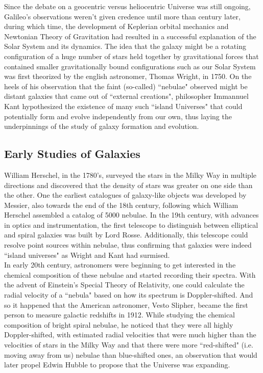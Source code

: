 Since the debate on a geocentric versus heliocentric Universe was still ongoing, Galileo's observations weren't given credence until more than century later, during which time, the development of Keplerian orbital mechanics and Newtonian Theory of Gravitation had resulted in a successful explanation of the Solar System and its dynamics. The idea that the galaxy might be a rotating configuration of a huge number of stars held together by gravitational forces that contained smaller gravitationally bound configurations such as our Solar System was first theorized by the english astronomer, Thomas Wright, in 1750. On the heels of his observation that the faint (so-called) ``nebulae" observed might be distant galaxies that came out of ``external creations", philosopher Immannuel Kant hypothesized the existence of many such ``island Universes" that could potentially form and evolve independently from our own, thus laying the underpinnings of the study of galaxy formation and evolution.\\

\subsection{Early Studies of Galaxies}

William Herschel, in the 1780's, surveyed the stars in the Milky Way in multiple directions and discovered that the density of stars was greater on one side than the other. One the earliest catalogues of galaxy-like objects was developed by Messier, also towards the end of the 18th century, following which William Herschel assembled a catalog of 5000 nebulae. In the 19th century, with advances in optics and instrumentation, the first telescope to distinguish between elliptical and spiral galaxies was built by Lord Rosse. Additionally, this telescope could resolve point sources within nebulae, thus confirming that galaxies were indeed ``island universes" as Wright and Kant had surmised.\\

In early 20th century, astronomers were beginning to get interested in the chemical composition of these nebulae and started recording their spectra. With the advent of Einstein's Special Theory of Relativity, one could calculate the radial velocity of a ``nebula" based on how its spectrum is Doppler-shifted. And so it happened that the American astronomer, Vesto Slipher, became the first person to measure galactic redshifts in 1912. While studying the chemical composition of bright spiral nebulae, he noticed that they were all highly Doppler-shifted, with estimated radial velocities that were much higher than the velocities of stars in the Milky Way and that there were more ``red-shifted" (i.e. moving away from us) nebulae than blue-shifted ones, an observation that would later propel Edwin Hubble to propose that the Universe was expanding.\\

